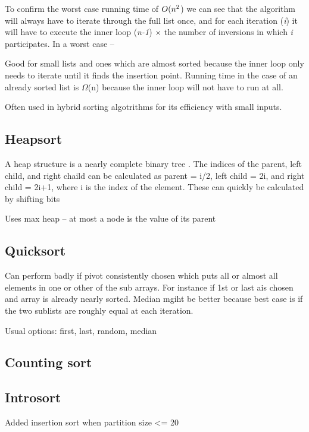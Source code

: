 \documentclass[12pt, a4paper]{article}
\begin{document}
To confirm the worst case running time of $O(n\textsuperscript{2}$) we can see that the algorithm will always have to iterate through the full list once, and for each iteration (\emph{i}) it will have to execute the inner loop (\emph{n-1}) $\times$ the number of inversions in which \emph{i} participates. In a worst case -- 




Good for small lists and ones which are almost sorted because the inner loop only needs to iterate until it finds the insertion point. Running time in the case of an already sorted list is $\Omega$(n) because the inner loop will not have to run at all.

Often used in hybrid sorting algotrithms for its efficiency with small inputs.

\subsection{Heapsort}

A heap structure is a nearly complete binary tree \autocite[p. 128]{cormen01}. The indices of the parent, left child, and right chaild can be calculated as parent = i/2, left child = 2i, and right child = 2i+1, where i is the index of the element. These can quickly be calculated by shifting bits \autocite[p. 128]{cormen01}

Uses max heap -- at most a node is the value of its parent
\subsection{Quicksort}

Can perform badly if pivot consistently chosen which puts all or almost all elements in one or other of the sub arrays. For instance if 1st or last ais chosen and array is already nearly sorted. Median mgiht be better because best case is if the two sublists are roughly equal at each iteration.

Usual options: first, last, random, median

\subsection{Counting sort}

\subsection{Introsort}

Added insertion sort when partition size <= 20 
\end{document}
